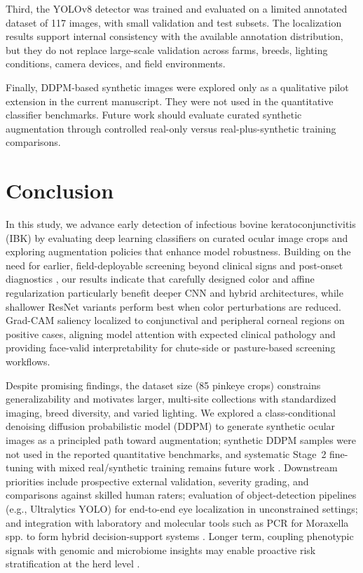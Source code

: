 \documentclass[preprint,12pt,authoryear]{elsarticle}
\begin{document}
Third, the YOLOv8 detector was trained and evaluated on a limited annotated dataset of 117 images, with small validation and test subsets. The localization results support internal consistency with the available annotation distribution, but they do not replace large-scale validation across farms, breeds, lighting conditions, camera devices, and field environments.

Finally, DDPM-based synthetic images were explored only as a qualitative pilot extension in the current manuscript. They were not used in the quantitative classifier benchmarks. Future work should evaluate curated synthetic augmentation through controlled real-only versus real-plus-synthetic training comparisons.

\section{Conclusion}
In this study, we advance early detection of infectious bovine keratoconjunctivitis (IBK) by evaluating deep learning classifiers on curated ocular image crops and exploring augmentation policies that enhance model robustness. Building on the need for earlier, field-deployable screening beyond clinical signs and post-onset diagnostics \citep{brown1998, angelos2015}, our results indicate that carefully designed color and affine regularization particularly benefit deeper CNN and hybrid architectures, while shallower ResNet variants perform best when color perturbations are reduced. Grad-CAM saliency localized to conjunctival and peripheral corneal regions on positive cases, aligning model attention with expected clinical pathology and providing face-valid interpretability for chute-side or pasture-based screening workflows.

Despite promising findings, the dataset size (85 pinkeye crops) constrains generalizability and motivates larger, multi-site collections with standardized imaging, breed diversity, and varied lighting. We explored a class-conditional denoising diffusion probabilistic model (DDPM) to generate synthetic ocular images as a principled path toward augmentation; synthetic DDPM samples were not used in the reported quantitative benchmarks, and systematic Stage~2 fine-tuning with mixed real/synthetic training remains future work \citep{ho2020ddpm}. Downstream priorities include prospective external validation, severity grading, and comparisons against skilled human raters; evaluation of object-detection pipelines (e.g., Ultralytics YOLO) for end-to-end eye localization in unconstrained settings; and integration with laboratory and molecular tools such as PCR for Moraxella spp. to form hybrid decision-support systems \citep{angelos2007, angelos2015}. Longer term, coupling phenotypic signals with genomic and microbiome insights may enable proactive risk stratification at the herd level \citep{kizilkaya2013, holman2017, gupta2023}.
\end{document}
